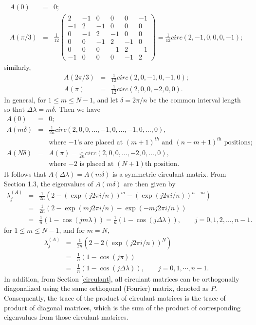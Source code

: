 \begin{eqnarray*}
A(0) &=& 0 ;  \\
A(\pi/3) &=& \frac{1}{12} \left(\begin{array}{cccccc}
2  &  -1 & 0  & 0 & 0 & -1 \\
-1 &  2  & -1 & 0 & 0 & 0   \\
0  & -1  & 2  & -1 & 0  & 0 \\
0  & 0   & -1 & 2  & -1 & 0 \\
0  & 0   &  0 & -1 & 2  & -1 \\
-1 & 0   &  0 &  0 & -1 & 2
\end{array}
\right) = \frac{1}{12} circ(2, -1, 0, 0, 0, -1);
\end{eqnarray*}
similarly,
\begin{eqnarray*}
A(2\pi/3) &=&  \frac{1}{12} circ(2, 0, -1, 0, -1, 0);\\
A(\pi) &=& \frac{1}{12} circ(2, 0, 0, -2, 0, 0).
\end{eqnarray*}
In general, for $1 \le m \le N-1$, and let $\delta = 2\pi/n$ be the common interval length so that $\Delta \lambda = m\delta$. Then we have
\begin{eqnarray*}
A(0) &=& 0; \\
A(m\delta) &=& \frac{1}{2n}circ(2, 0, 0, \ldots, -1, 0, \ldots, -1, 0, \ldots, 0), \\
& & \mbox{where $-1$'s are placed at $(m+1)^{th}$ and $(n-m+1)^{th}$ positions;} \\
A(N\delta) &=& A(\pi) = \frac{1}{2n}circ(2, 0, 0, \ldots, -2, 0, \ldots, 0),\\
& & \mbox{where $-2$ is placed at $(N+1)$th position.}
\end{eqnarray*}
It follows that $A(\Delta \lambda) = A(m\delta)$ is a symmetric circulant matrix. From Section 1.3, the eigenvalues of $A(m \delta)$ are then given by
\begin{eqnarray*}
\lambda_j^{(A)} &=& \frac{1}{2n}(2 - (\exp(j2\pi i/n))^m - (\exp(j2\pi i/n))^{n-m}) \\
&=& \frac{1}{2n}(2 - \exp(mj2\pi i/n) - \exp(-mj2\pi i/n)) \\
&=& \frac{1}{n}(1 - \cos(jm\lambda)) = \frac{1}{n}(1 - \cos(j\Delta \lambda)), \quad \quad j = 0, 1, 2, \ldots, n-1.
\end{eqnarray*}
for $1 \le m \le N-1$, and for $m = N$,
\begin{eqnarray*}
\lambda_j^{(A)} &=& \frac{1}{2n}(2 - 2 (\exp(j2\pi i/n))^{N}) \\
 &=& \frac{1}{n}(1 - \cos(j\pi)) \\
 &=& \frac{1}{n}(1 - \cos(j\Delta \lambda)), \quad \quad j = 0, 1, \cdots, n-1.
\end{eqnarray*}
In addition, from Section \ref{circulant}, all circulant matrices can be orthogonally diagonalized using the same orthogonal (Fourier) matrix, denoted as $P$. Consequently,
the trace of the product of circulant matrices is the trace of product of diagonal matrices, which is the sum of the product of corresponding eigenvalues from those circulant matrices. \\

